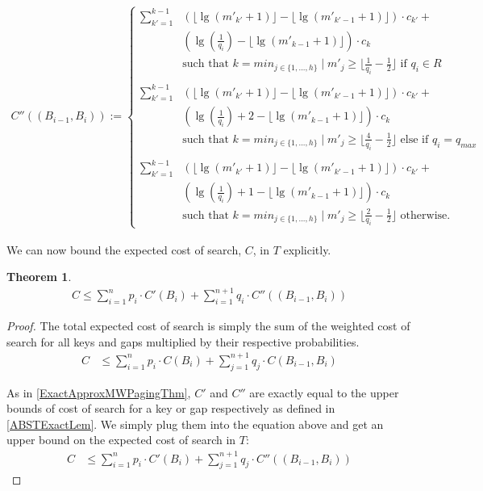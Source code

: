 \documentclass[letterpaper,12pt,titlepage,oneside,final]{book}
\theoremstyle{plain}
\newtheorem{thm}{Theorem}[section]
\begin{document}
\begin{align*}
C''((B_{i-1},B_i)) :=
\begin{cases}
 \sum_{k'=1}^{k-1} &\left(\lfloor \lg(m'_{k'}+1) \rfloor - \lfloor \lg(m'_{k'-1}+1) \rfloor \right)\cdot c_{k'}+ \\
 &\left(\lg(\frac{1}{q_i}) - \lfloor \lg(m'_{k-1}+1) \rfloor \right)\cdot c_k\\
&\text{such that } k=min_{j \in \{1, ..., h\}} \mid m'_j \geq \lfloor \frac{1}{q_i}-\frac{1}{2} \rfloor \text{ if } q_i \in R  \\\\
  \sum_{k'=1}^{k-1} &\left(\lfloor \lg(m'_{k'}+1) \rfloor - \lfloor \lg(m'_{k'-1}+1) \rfloor \right)\cdot c_{k'}+ \\
 &\left(\lg(\frac{1}{q_i}) + 2 - \lfloor \lg(m'_{k-1}+1) \rfloor \right)\cdot c_k\\
&\text{such that } k=min_{j \in \{1, ..., h\}} \mid m'_j \geq \lfloor \frac{4}{q_i}-\frac{1}{2} \rfloor \text{ else if } q_i = q_{max}  \\\\
 \sum_{k'=1}^{k-1} &\left(\lfloor \lg(m'_{k'}+1) \rfloor - \lfloor \lg(m'_{k'-1}+1) \rfloor \right)\cdot c_{k'}+ \\
 &\left(\lg(\frac{1}{q_i})+1 - \lfloor \lg(m'_{k-1}+1) \rfloor \right)\cdot c_k\\
&\text{such that } k=min_{j \in \{1, ..., h\}} \mid m'_j \geq \lfloor \frac{2}{q_i}-\frac{1}{2} \rfloor \text{ otherwise.}
\end{cases}
\end{align*}

We can now bound the expected cost of search, $C$, in $T$ explicitly.

\begin{thm} \label{ExactApproxBSTPagingThm}
\begin{align*}
C \leq \sum_{i=1}^{n} p_i\cdot  C'(B_i) + \sum_{i=1}^{n+1} q_i\cdot C''((B_{i-1},B_i)) 
\end{align*}

\end{thm}

\begin{proof}
The total expected cost of search is simply the sum of the weighted cost of search for all keys and gaps multiplied by their respective probabilities.
\begin{align*}
C &\leq \sum_{i=1}^{n} p_i\cdot C(B_i) + \sum_{j=1}^{n+1} q_j\cdot C(B_{i-1},B_i) 
\end{align*}

As in \ref{ExactApproxMWPagingThm}, $C'$ and $C''$ are exactly equal to the upper bounds of cost of search for a key or gap respectively as defined in \ref{ABSTExactLem}. We simply plug them into the equation above and get an upper bound on the expected cost of search in $T$:
\begin{align*}
C &\leq \sum_{i=1}^{n} p_i\cdot C'(B_i) + \sum_{j=1}^{n+1} q_j\cdot C''((B_{i-1},B_i))
\end{align*}

\end{proof}
\end{document}
